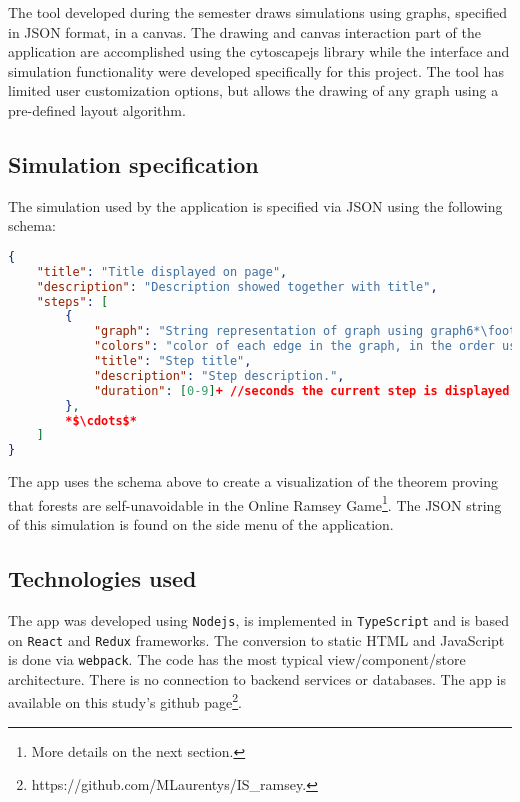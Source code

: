 The tool developed during the semester draws simulations using graphs, specified in JSON format, in a canvas. The drawing and canvas interaction part of the application are accomplished using the cytoscapejs library while the interface and simulation functionality were developed specifically for this project. The tool has limited user customization options, but allows the drawing of any graph using a pre-defined layout algorithm.

\subsection*{Simulation specification}

The simulation used by the application is specified via JSON using the following schema:

\begin{lstlisting}[language=json,firstnumber=1,escapechar=*]
{
	"title": "Title displayed on page",
	"description": "Description showed together with title",
	"steps": [
		{
			"graph": "String representation of graph using graph6*\footnote{Compact representation of graphs via strings. Format created by Brendan McKay. Find the specification at https://users.cecs.anu.edu.au/$\sim$bdm/data/formats.txt.}* format.",
			"colors": "color of each edge in the graph, in the order used in the upper triangle of the 'graph'. Specified with a sequence of characters between 'r' (red),  *\mbox{'b' (blue)}*, 'g' (gray) and 'w' (white).",
			"title": "Step title",
			"description": "Step description.",
			"duration": [0-9]+ //seconds the current step is displayed
		},
		*$\cdots$*
	]
}
\end{lstlisting}

The app uses the schema above to create a visualization of the theorem proving that forests are self-unavoidable in the Online Ramsey Game\footnote{More details on the next section.}. The JSON string of this simulation is found on the side menu of the application.

\subsection*{Technologies used}

The app was developed using \texttt{Nodejs}, is implemented in \texttt{TypeScript} and is based on \texttt{React} and \texttt{Redux} frameworks. The conversion to static HTML and JavaScript is done via \texttt{webpack}. The code has the most typical view/component/store architecture. There is no connection to backend services or databases. The app is available on this study's github page\footnote{https://github.com/MLaurentys/IS\_ramsey.}.

